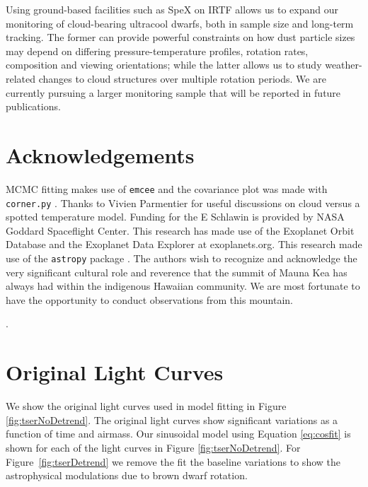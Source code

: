 \documentclass[twocolumn]{aastex6}
\begin{document}
Using ground-based facilities such as SpeX on IRTF allows us to expand our monitoring of cloud-bearing ultracool dwarfs, both in sample size and long-term tracking. The former can provide powerful constraints on how dust particle sizes may depend on differing pressure-temperature profiles, rotation rates, composition and viewing orientations; while the latter allows us to study weather-related changes to cloud structures over multiple rotation periods. We are currently pursuing a larger monitoring sample that will be reported in future publications.


\section{Acknowledgements}
MCMC fitting makes use of \texttt{emcee} \citep{foreman-mackey2013emcee} and the covariance plot was made with \texttt{corner.py} \citep{foremanCorner}.
Thanks to Vivien Parmentier for useful discussions on cloud versus a spotted temperature model.
Funding for the E Schlawin is provided by NASA Goddard Spaceflight Center.
This research has made use of the Exoplanet Orbit Database and the Exoplanet Data Explorer at exoplanets.org.
This research made use of the \texttt{astropy} package \citep{astropy2013}. The authors wish to recognize and acknowledge the very significant cultural role and reverence that the summit of Mauna Kea has always had within the indigenous Hawaiian community. We are most fortunate to have the opportunity to conduct observations from this mountain.

\acknowledgments


.

\appendix

\section{Original Light Curves}

We show the original light curves used in model fitting in Figure \ref{fig:tserNoDetrend}.
The original light curves show significant variations as a function of time and airmass.
Our sinusoidal model using Equation \ref{eq:cosfit} is shown for each of the light curves in Figure \ref{fig:tserNoDetrend}.
For Figure~\ref{fig:tserDetrend} we remove the fit the baseline variations to show the astrophysical modulations due to brown dwarf rotation.
\end{document}

